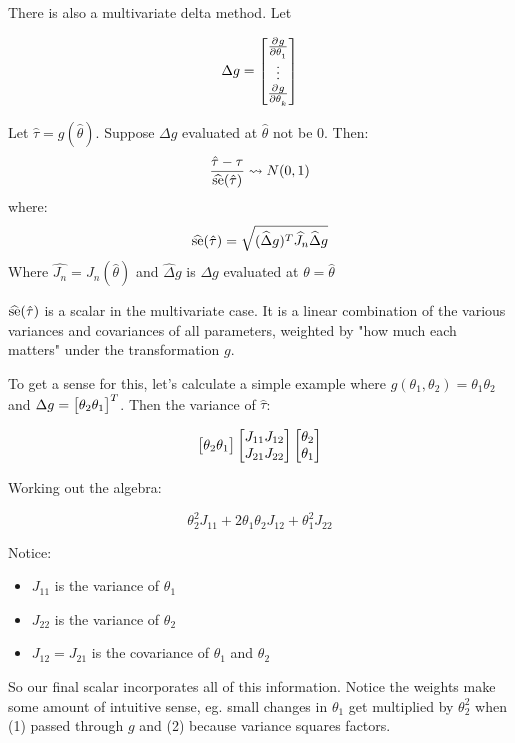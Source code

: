 \documentclass[10pt]{article}
\begin{document}
There is also a multivariate delta method. Let

\[\Delta g = \begin{bmatrix} \frac{\partial^{} g}{\partial \theta_1^{}} \\ \vdots \\ \frac{\partial^{} g}{\partial \theta_k^{}} \end{bmatrix}\]

\begin{theorem}
    Let $\hat{\tau} = g(\hat{\theta})$. Suppose $\Delta g$ evaluated at
    $\hat{\theta}$ not be 0. Then:
\[\frac{\hat{\tau} - \tau}{\widehat{\operatorname{se}}(\hat{\tau})} \rightsquigarrow N(0, 1)\]
    where: 
    \[\widehat{\operatorname{se}}(\hat{\tau}) = \sqrt{(\widehat{\Delta} g)^T \widehat{J}_n \widehat{\Delta} g}\]
    Where $\widehat{J_n} = J_n(\hat{\theta})$ and $\widehat{\Delta} g$ is $\Delta g$
    evaluated at $\theta = \hat{\theta}$
\end{theorem}

\begin{note}

$\widehat{\operatorname{se}}(\hat{\tau})$ is a scalar in the multivariate case. It is a
linear combination of the various variances and covariances of all parameters, 
weighted by "how much each matters" under the transformation $g$.

To get a sense for this, let's calculate a simple example where $g(\theta_1,
\theta_2) = \theta_1\theta_2$ and $\Delta g = \begin{bmatrix} \theta_2 \theta_1 \end{bmatrix}^T$. Then
the variance of $\hat{\tau}$:

\[ \begin{bmatrix} \theta_2 \theta_1 \end{bmatrix} \begin{bmatrix} J_{11} J_{12} \\ J_{21} J_{22} \end{bmatrix} \begin{bmatrix} \theta_2 \\ \theta_1 \end{bmatrix} \] 

Working out the algebra:

\[ \theta_2^2 J_{11} + 2\theta_1 \theta_2 J_{12} + \theta_1^2 J_{22}\] 

Notice:

\begin{itemize}
    \item{$J_{11}$ is the variance of $\theta_1$}
    \item{$J_{22}$ is the variance of $\theta_2$}
    \item{$J_{12} = J_{21}$ is the covariance of $\theta_1$ and $\theta_2$}
\end{itemize}

So our final scalar incorporates all of this information. Notice the weights
make some amount of intuitive sense, eg. small changes in $\theta_1$ get
multiplied by $\theta_2^2$ when (1) passed through $g$ and (2) because variance
squares factors.
\end{note}
\end{document}
